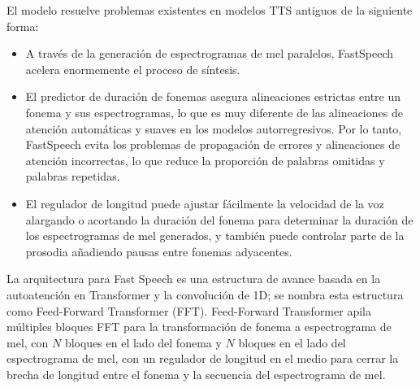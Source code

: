 
El modelo resuelve problemas existentes en modelos TTS antiguos de la siguiente forma:

\begin{itemize}
	\item A través de la generación de espectrogramas de mel paralelos, FastSpeech acelera enormemente el proceso de síntesis.
	\item El predictor de duración de fonemas asegura alineaciones estrictas entre un fonema y sus espectrogramas, lo que es muy diferente de las alineaciones de atención automáticas y suaves en los modelos autorregresivos. Por lo tanto, FastSpeech evita los problemas de propagación de errores y alineaciones de atención incorrectas, lo que reduce la proporción de palabras omitidas y palabras repetidas.
	\item El regulador de longitud puede ajustar fácilmente la velocidad de la voz alargando o acortando la duración del fonema para determinar la duración de los espectrogramas de mel generados, y también puede controlar parte de la prosodia añadiendo pausas entre fonemas adyacentes.
\end{itemize}



La arquitectura para Fast Speech es una estructura de avance basada en la autoatención en Transformer y la convolución de 1D; se nombra esta estructura como Feed-Forward Transformer (FFT). Feed-Forward Transformer apila múltiples bloques FFT para la transformación de fonema a espectrograma de mel, con $N$ bloques en el lado del fonema y $N$ bloques en el lado del espectrograma de mel, con un regulador de longitud en el medio para cerrar la brecha de longitud entre el fonema y la secuencia del espectrograma de mel. %


